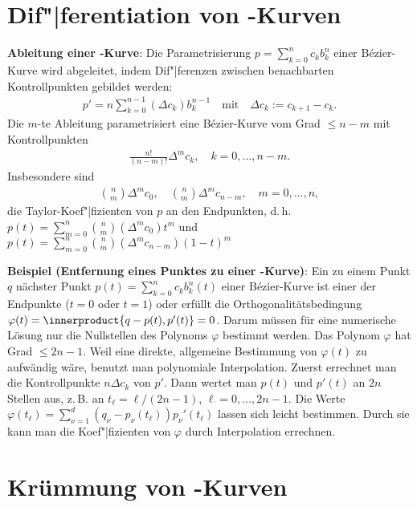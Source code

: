 \section{%
    Dif"|ferentiation von -Kurven%
}

\textbf{Ableitung einer -Kurve}:
Die Parametrisierung $p = \sum_{k=0}^n c_k b_k^n$ einer Bézier-Kurve wird abgeleitet, indem
Dif"|ferenzen zwischen benachbarten Kontrollpunkten gebildet werden:
\begin{align*}
    p' = n \sum_{k=0}^{n-1} (\Delta c_k) b_k^{n-1}\quad\text{mit}\quad
    \Delta c_k := c_{k+1} - c_k.
\end{align*}
Die $m$-te Ableitung parametrisiert eine Bézier-Kurve vom Grad $\le n - m$ mit Kontrollpunkten
\begin{align*}
    \frac{n!}{(n - m)!} \Delta^m c_k,\quad
    k = 0, \dotsc, n - m.
\end{align*}
Insbesondere sind
\begin{align*}
    \binom{n}{m} \Delta^m c_0,\quad
    \binom{n}{m} \Delta^m c_{n-m},\quad
    m = 0, \dotsc, n,
\end{align*}
die Taylor-Koef"|fizienten von $p$ an den Endpunkten, d.\,h.
$p(t) = \sum_{m=0}^n \binom{n}{m} (\Delta^m c_0) t^m$ und\\
$p(t) = \sum_{m=0}^n \binom{n}{m} (\Delta^m c_{n-m}) (1 - t)^m$

\linie

\textbf{Beispiel (Entfernung eines Punktes zu einer -Kurve)}:
Ein zu einem Punkt $q$ nächster Punkt $p(t) = \sum_{k=0}^n c_k b_k^n(t)$ einer Bézier-Kurve ist
einer der Endpunkte ($t = 0$ oder $t = 1$) oder erfüllt die Orthogonalitätsbedingung
$\varphi(t) = \innerproduct{q - p(t), p'(t)} = 0$.
Darum müssen für eine numerische Lösung nur die Nullstellen des Polynoms $\varphi$
bestimmt werden.
Das Polynom $\varphi$ hat Grad $\le 2n - 1$.
Weil eine direkte, allgemeine Bestimmung von $\varphi(t)$ zu aufwändig wäre,
benutzt man polynomiale Interpolation.
Zuerst errechnet man die Kontrollpunkte $n \Delta c_k$ von $p'$.
Dann wertet man $p(t)$ und $p'(t)$ an $2n$ Stellen aus, z.\,B. an $t_\ell = \ell/(2n - 1)$,
$\ell = 0, \dotsc, 2n - 1$.
Die Werte $\varphi(t_\ell) = \sum_{\nu=1}^d (q_\nu - p_\nu(t_\ell)) p_\nu'(t_\ell)$
lassen sich leicht bestimmen.
Durch sie kann man die Koef"|fizienten von $\varphi$ durch Interpolation errechnen.

\section{%
    Krümmung von -Kurven%
}

